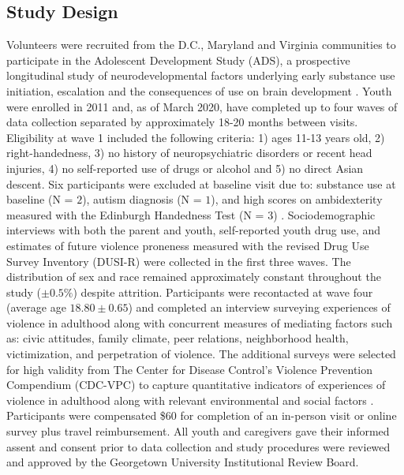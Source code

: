 \documentclass[utf8]{article}
\begin{document}
\subsection{Study Design} 
Volunteers were recruited from the D.C., Maryland and Virginia communities to participate in the Adolescent Development Study (ADS), a prospective longitudinal study of neurodevelopmental factors underlying early substance use initiation, escalation and the consequences of use on brain development \citep{Fishbein2016}. Youth were enrolled in 2011 and, as of March 2020, have completed up to four waves of data collection separated by approximately 18-20 months between visits. Eligibility at wave 1 included the following criteria: 1) ages 11-13 years old, 2) right-handedness, 3) no history of neuropsychiatric disorders or recent head injuries, 4) no self-reported use of drugs or alcohol and 5) no direct Asian descent. Six participants were excluded at baseline visit due to: substance use at baseline (N = $2$), autism diagnosis (N = $1$), and high scores on ambidexterity measured with the Edinburgh Handedness Test (N = $3$) \citep{veale2014edinburgh}. Sociodemographic interviews with both the parent and youth, self-reported youth drug use, and estimates of future violence proneness measured with the revised Drug Use Survey Inventory (DUSI-R) \citep{tarter1994reliability} were collected in the first three waves. The distribution of sex and race remained approximately constant throughout the study ($\pm0.5\%$) despite attrition. Participants were recontacted at wave four (average age $18.80\pm0.65$) and completed an interview surveying experiences of violence in adulthood along with concurrent measures of mediating factors such as: civic attitudes, family climate, peer relations, neighborhood health, victimization, and perpetration of violence. The additional surveys were selected for high validity from The Center for Disease Control’s Violence Prevention Compendium (CDC-VPC) to capture quantitative indicators of experiences of violence in adulthood along with relevant environmental and social factors \citep{dahlberg2005measuring}. Participants were compensated \$$60$ for completion of an in-person visit or online survey plus travel reimbursement. All youth and caregivers gave their informed assent and consent prior to data collection and study procedures were reviewed and approved by the Georgetown University Institutional Review Board.
\end{document}
